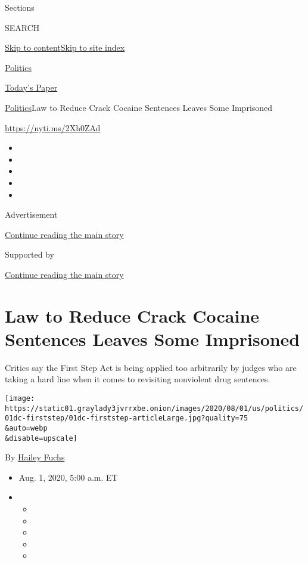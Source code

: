 Sections

SEARCH

\protect\hyperlink{site-content}{Skip to
content}\protect\hyperlink{site-index}{Skip to site index}

\href{https://www.nytimes3xbfgragh.onion/section/politics}{Politics}

\href{https://myaccount.nytimes3xbfgragh.onion/auth/login?response_type=cookie\&client_id=vi}{}

\href{https://www.nytimes3xbfgragh.onion/section/todayspaper}{Today's
Paper}

\href{/section/politics}{Politics}\textbar{}Law to Reduce Crack Cocaine
Sentences Leaves Some Imprisoned

\url{https://nyti.ms/2Xh0ZAd}

\begin{itemize}
\item
\item
\item
\item
\item
\end{itemize}

Advertisement

\protect\hyperlink{after-top}{Continue reading the main story}

Supported by

\protect\hyperlink{after-sponsor}{Continue reading the main story}

\hypertarget{law-to-reduce-crack-cocaine-sentences-leaves-some-imprisoned}{%
\section{Law to Reduce Crack Cocaine Sentences Leaves Some
Imprisoned}\label{law-to-reduce-crack-cocaine-sentences-leaves-some-imprisoned}}

Critics say the First Step Act is being applied too arbitrarily by
judges who are taking a hard line when it comes to revisiting nonviolent
drug sentences.

\texttt{[image: https://static01.graylady3jvrrxbe.onion/images/2020/08/01/us/politics/01dc-firststep/01dc-firststep-articleLarge.jpg?quality=75\\\&auto=webp\\\&disable=upscale]}

By \href{https://www.nytimes3xbfgragh.onion/by/hailey-fuchs}{Hailey
Fuchs}

\begin{itemize}
\item
  Aug. 1, 2020, 5:00 a.m. ET
\item
  \begin{itemize}
  \item
  \item
  \item
  \item
  \item
  \end{itemize}
\end{itemize}

